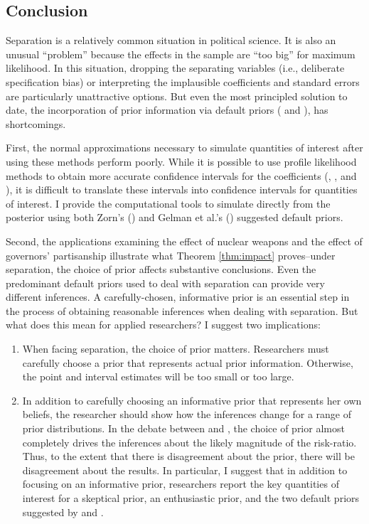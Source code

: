 \documentclass[12pt]{article}
\begin{document}
\subsection*{Conclusion}

Separation is a relatively common situation in political science. 
It is also an unusual ``problem'' because the effects in the sample are ``too big'' for maximum likelihood. 
In this situation, dropping the separating variables (i.e., deliberate specification bias) or interpreting the implausible coefficients and standard errors are particularly unattractive options. 
But even the most principled solution to date, the incorporation of prior information via default priors (\citealt{Zorn2005} and \citealt{Gelmanetal2008}), has shortcomings.

First, the normal approximations necessary to simulate quantities of interest after using these methods perform poorly. 
While it is possible to use profile likelihood methods to obtain more accurate confidence intervals for the coefficients (\citealt{Zorn2005}, \citealt{HeinzeSchemper2002}, and \citealt{McCullaghNelder1989}), it is difficult to translate these intervals into confidence intervals for quantities of interest. 
I provide the computational tools to simulate directly from the posterior using both Zorn's (\citeyear{Zorn2005}) and Gelman et al.'s (\citeyear{Gelmanetal2008}) suggested default priors.

Second, the applications examining the effect of nuclear weapons and the effect of governors' partisanship illustrate what Theorem \ref{thm:impact} proves--under separation, the choice of prior affects substantive conclusions. 
Even the predominant default priors used to deal with separation can provide very different inferences. 
A carefully-chosen, informative prior is an essential step in the process of obtaining reasonable inferences when dealing with separation. 
But what does this mean for applied researchers? 
I suggest two implications:
\begin{enumerate}
\item When facing separation, the choice of prior matters. 
Researchers must carefully choose a prior that represents actual prior information. 
Otherwise, the point and interval estimates will be too small or too large.
\item In addition to carefully choosing an informative prior that represents her own beliefs, the researcher should show how the inferences change for a range of prior distributions. 
In the debate between \cite{BellMiller2015} and \cite{Rauchhaus2009}, the choice of prior almost completely drives the inferences about the likely magnitude of the risk-ratio. 
Thus, to the extent that there is disagreement about the prior, there will be disagreement about the results. 
In particular, I suggest that in addition to focusing on an informative prior, researchers report the key quantities of interest for a skeptical prior, an enthusiastic prior, and the two default priors suggested by \cite{Zorn2005} and \cite{Gelmanetal2008}.
\end{enumerate}
\end{document}
